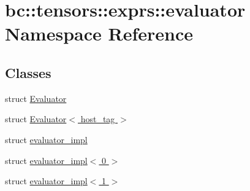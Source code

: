 \hypertarget{namespacebc_1_1tensors_1_1exprs_1_1evaluator}{}\section{bc\+:\+:tensors\+:\+:exprs\+:\+:evaluator Namespace Reference}
\label{namespacebc_1_1tensors_1_1exprs_1_1evaluator}
\subsection*{Classes}
\begin{DoxyCompactItemize}
\item 
struct \hyperlink{structbc_1_1tensors_1_1exprs_1_1evaluator_1_1Evaluator}{Evaluator}
\item 
struct \hyperlink{structbc_1_1tensors_1_1exprs_1_1evaluator_1_1Evaluator_3_01host__tag_01_4}{Evaluator$<$ host\+\_\+tag $>$}
\item 
struct \hyperlink{structbc_1_1tensors_1_1exprs_1_1evaluator_1_1evaluator__impl}{evaluator\+\_\+impl}
\item 
struct \hyperlink{structbc_1_1tensors_1_1exprs_1_1evaluator_1_1evaluator__impl_3_010_01_4}{evaluator\+\_\+impl$<$ 0 $>$}
\item 
struct \hyperlink{structbc_1_1tensors_1_1exprs_1_1evaluator_1_1evaluator__impl_3_011_01_4}{evaluator\+\_\+impl$<$ 1 $>$}
\end{DoxyCompactItemize}
